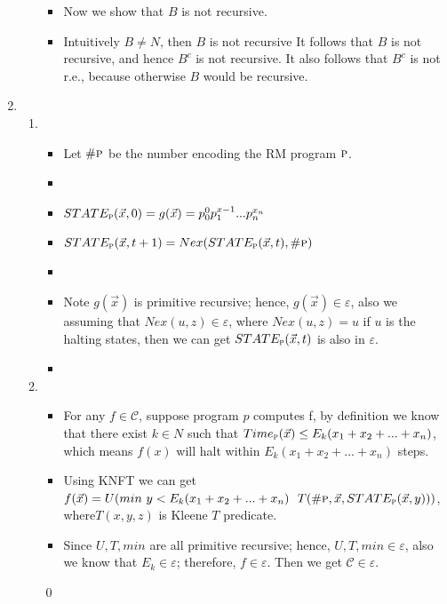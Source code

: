\documentclass[11pt,twoside]{article}
\begin{document}
\begin{enumerate}[leftmargin=0pt]
\begin{enumerate}
\begin{itemize}[label = {}]
	\end{itemize}
	\begin{itemize}[label ={}]
	\item Now we show that $B$ is  not recursive. 
	\item Intuitively $B \neq N$, then $B$ is not recursive
	It follows that $B$ is not recursive, and hence $B^c$ is not recursive. It also follows that $B^c$ is not r.e., because otherwise $B$ would be recursive. 
	\end{itemize}
\end{enumerate}
\item
\begin{enumerate}
\item \begin{itemize}[label = {}]
	\item Let $\#\textsc{p}$ be the number encoding the RM program $\textsc{p}$.
	\item
	\item $STATE_\textsc{p}(\vec x,0 ) = g(\vec x) = p_0^0p_1^{x-1}...p_n^{x_n}$
	\item $STATE_\textsc{p}(\vec x,t+1) = Nex(STATE_\textsc{p}(\vec x,t), \#\textsc{p})$
	\item
	\item Note $g(\vec x)$ is primitive recursive; hence, $g(\vec x) \in \varepsilon$, also we assuming that $Nex(u,z) \in \varepsilon$, where $Nex(u,z) = u$ if $u$ is the halting states,  then we can get $STATE_\textsc{p}(\vec x,t )$ is also in $\varepsilon$.
	\item
	\end{itemize}
\item \begin{itemize}[label = {}]
	\item For any $f \in \mathcal{C}$, suppose program $p$ computes f, by definition we know that there exist $k \in N$ such that $Time_\textsc{p}(\vec x) \leq E_k(x_1+x_2+...+x_n)$, which means $f(x)$ will halt within $E_k(x_1+x_2+...+x_n)$ steps.
	\item Using KNFT we can get $f(\vec x) = U(min \ y<E_k(x_1+x_2+...+x_n)\ \   T(\#\textsc{p}, \vec x, STATE_\textsc{p}(\vec x,y)))$, where$T(x,y,z)$ is Kleene $T$ predicate.
	\item Since $U, T, min$ are all primitive recursive; hence, $U, T, min \in \varepsilon$, also we know that 
	$E_k \in \varepsilon$; therefore, $f \in \varepsilon$. Then we get $\mathcal C \in \varepsilon$.
	\end{itemize}
	\qed
\end{enumerate}


\end{enumerate}
\end{document}
